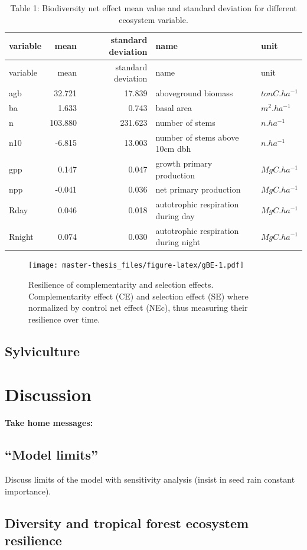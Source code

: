 \documentclass[12pt,]{article}
\let\oldsection\section
\renewcommand\section{\newpage\oldsection}
\theoremstyle{definition}
\theoremstyle{definition}
\theoremstyle{remark}
\begin{document}
\begin{longtable}[]{@{}lrrll@{}}
\caption{\label{tab:tNE}Table 1: Biodiversity net effect mean value and
standard deviation for different ecosystem variable.}\tabularnewline
\toprule
variable & mean & standard deviation & name & unit\tabularnewline
\midrule
\endfirsthead
\toprule
variable & mean & standard deviation & name & unit\tabularnewline
\midrule
\endhead
agb & 32.721 & 17.839 & aboveground biomass &
\(tonC.ha^{-1}\)\tabularnewline
ba & 1.633 & 0.743 & basal area & \(m^2.ha^{-1}\)\tabularnewline
n & 103.880 & 231.623 & number of stems & \(n.ha^{-1}\)\tabularnewline
n10 & -6.815 & 13.003 & number of stems above 10cm dbh &
\(n.ha^{-1}\)\tabularnewline
gpp & 0.147 & 0.047 & growth primary production &
\(MgC.ha^{-1}\)\tabularnewline
npp & -0.041 & 0.036 & net primary production &
\(MgC.ha^{-1}\)\tabularnewline
Rday & 0.046 & 0.018 & autotrophic respiration during day &
\(MgC.ha^{-1}\)\tabularnewline
Rnight & 0.074 & 0.030 & autotrophic respiration during night &
\(MgC.ha^{-1}\)\tabularnewline
\bottomrule
\end{longtable}

\begin{figure}[htbp]
\centering
\texttt{[image: master-thesis\_files/figure-latex/gBE-1.pdf]}
\caption{\label{fig:gBE}Resilience of complementarity and selection effects.
Complementarity effect (CE) and selection effect (SE) where normalized
by control net effect (NEc), thus measuring their resilience over time.}
\end{figure}

\subsection{Sylviculture}\label{sylviculture-1}

\section{Discussion}\label{discussion}

\textbf{Take home messages:}

\subsection{\texorpdfstring{``Model
limits''}{Model limits}}\label{model-limits}

Discuss limits of the model with sensitivity analysis (insist in seed
rain constant importance).

\subsection{Diversity and tropical forest ecosystem
resilience}\label{diversity-and-tropical-forest-ecosystem-resilience}
\end{document}
